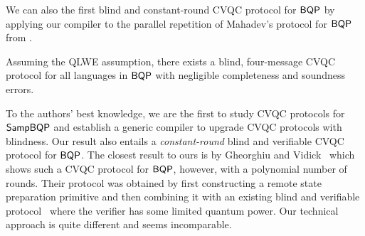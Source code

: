 We can also the first blind and constant-round CVQC protocol for $\operatorname{\mathsf{BQP}}$ by applying our compiler to the parallel repetition of Mahadev's protocol for $\operatorname{\mathsf{BQP}}$ from \cite{arXiv:ChiaChungYam19, arXiv:AlaChiHun19}.


\begin{theorem}[informal]
    Assuming the QLWE assumption, there exists a blind, four-message CVQC protocol for all languages in $\operatorname{\mathsf{BQP}}$ with negligible completeness and soundness errors.
\end{theorem}




To the authors' best knowledge, we are the first to study CVQC protocols for $\operatorname{\mathsf{SampBQP}}$ and establish a generic compiler to upgrade CVQC protocols with blindness.
Our result also entails a \emph{constant-round} blind and verifiable CVQC protocol for $\operatorname{\mathsf{BQP}}$.
The closest result to ours is by Gheorghiu and Vidick~\cite{FOCS:GheVid19} which shows such a CVQC protocol for $\operatorname{\mathsf{BQP}}$, however, with a polynomial number of rounds.
Their protocol was obtained by first constructing a remote state preparation primitive and then combining it with an existing blind and verifiable protocol~\cite{FK17} where the verifier has some limited quantum power.
Our technical approach is quite different and seems incomparable.


